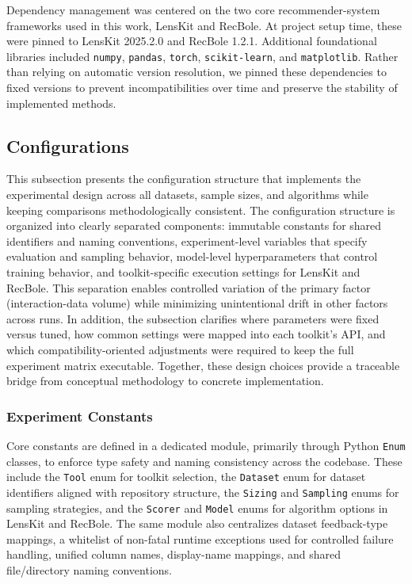 \documentclass[12pt,a4paper]{article}
\begin{document}
Dependency management was centered on the two core recommender-system frameworks used in this work, LensKit and RecBole. At project setup time, these were pinned to LensKit 2025.2.0 and RecBole 1.2.1. Additional foundational libraries included \texttt{numpy}, \texttt{pandas}, \texttt{torch}, \texttt{scikit-learn}, and \texttt{matplotlib}. Rather than relying on automatic version resolution, we pinned these dependencies to fixed versions to prevent incompatibilities over time and preserve the stability of implemented methods.

\subsection{Configurations}
This subsection presents the configuration structure that implements the experimental design across all datasets, sample sizes, and algorithms while keeping comparisons methodologically consistent. The configuration structure is organized into clearly separated components: immutable constants for shared identifiers and naming conventions, experiment-level variables that specify evaluation and sampling behavior, model-level hyperparameters that control training behavior, and toolkit-specific execution settings for LensKit and RecBole. This separation enables controlled variation of the primary factor (interaction-data volume) while minimizing unintentional drift in other factors across runs. In addition, the subsection clarifies where parameters were fixed versus tuned, how common settings were mapped into each toolkit's API, and which compatibility-oriented adjustments were required to keep the full experiment matrix executable. Together, these design choices provide a traceable bridge from conceptual methodology to concrete implementation.

\subsubsection{Experiment Constants}
Core constants are defined in a dedicated module, primarily through Python \texttt{Enum} classes, to enforce type safety and naming consistency across the codebase. These include the \texttt{Tool} enum for toolkit selection, the \texttt{Dataset} enum for dataset identifiers aligned with repository structure, the \texttt{Sizing} and \texttt{Sampling} enums for sampling strategies, and the \texttt{Scorer} and \texttt{Model} enums for algorithm options in LensKit and RecBole. The same module also centralizes dataset feedback-type mappings, a whitelist of non-fatal runtime exceptions used for controlled failure handling, unified column names, display-name mappings, and shared file/directory naming conventions.
\end{document}
